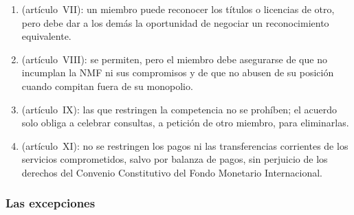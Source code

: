 \documentclass[11pt]{article}
\begin{document}
\begin{itemize}
\begin{enumerate}
  \item {} (artículo~VII): un miembro puede reconocer los títulos o licencias de otro, pero debe dar a los demás la oportunidad de negociar un reconocimiento equivalente.
  \item {} (artículo~VIII): se permiten, pero el miembro debe asegurarse de que no incumplan la NMF ni sus compromisos y de que no abusen de su posición cuando compitan fuera de su monopolio.
  \item {} (artículo~IX): las que restringen la competencia no se prohíben; el acuerdo solo obliga a celebrar consultas, a petición de otro miembro, para eliminarlas.
  \item {} (artículo~XI): no se restringen los pagos ni las transferencias corrientes de los servicios comprometidos, salvo por balanza de pagos, sin perjuicio de los derechos del Convenio Constitutivo del Fondo Monetario Internacional.
  \end{enumerate}
\end{itemize}

\subsubsection{Las excepciones}\label{sec:excepciones-agcs}
\end{document}
